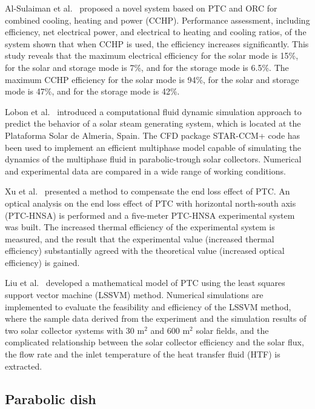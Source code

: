 Al-Sulaiman et al.~\cite{AlSulaiman2012} proposed a novel system based on PTC and ORC for combined cooling, heating and power (CCHP). Performance assessment, including efficiency, net electrical power, and electrical to heating and cooling ratios, of the system shown that when CCHP is used, the efficiency increases significantly. This study reveals that the maximum electrical efficiency for the solar mode is 15\%, for the solar and storage mode is 7\%, and for the storage mode is 6.5\%. The maximum CCHP efficiency for the solar mode is 94\%, for the solar and storage mode is 47\%, and for the storage mode is 42\%.

Lobon et al.~\cite{Lobon2014} introduced a computational fluid dynamic simulation approach to predict the behavior of a solar steam generating system, which is located at the Plataforma Solar de Almeria, Spain. The CFD package STAR-CCM+ code has been used to implement an efficient multiphase model capable of simulating the dynamics of the multiphase fluid in parabolic-trough solar collectors. Numerical and experimental data are compared in a wide range of working conditions.

Xu et al.~\cite{Xu2014} presented a method to compensate the end loss effect of PTC. An optical analysis on the end loss effect of PTC with horizontal north-south axis (PTC-HNSA) is performed and a five-meter PTC-HNSA experimental system was built. The increased thermal efficiency of the experimental system is measured, and the result that the experimental value (increased thermal efficiency) substantially agreed with the theoretical value (increased optical efficiency) is gained.

Liu et al.~\cite{Liu2012} developed a mathematical model of PTC using the least squares support vector machine (LSSVM) method. Numerical simulations are implemented to evaluate the feasibility and efficiency of the LSSVM method, where the sample data derived from the experiment and the simulation results of two solar collector systems with 30 m$^2$ and 600 m$^2$ solar fields, and the complicated relationship between the solar collector efficiency and the solar flux, the flow rate and the inlet temperature of the heat transfer fluid (HTF) is extracted.

\subsection{Parabolic dish}\label{sec:pd}

